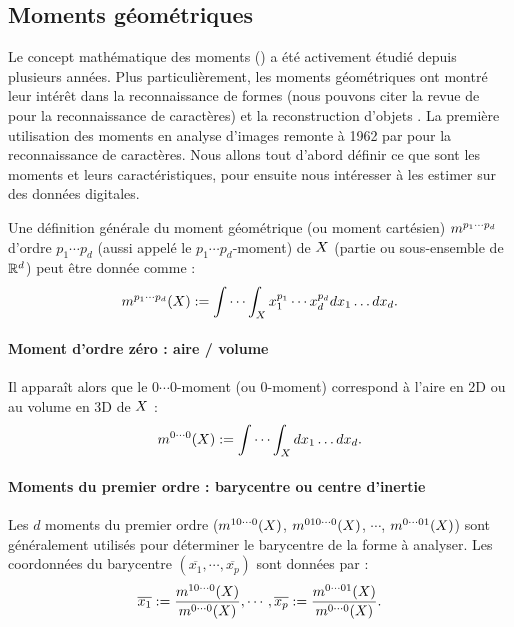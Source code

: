 \subsection{Moments géométriques}
\label{sec:moments-geo}
%
Le concept mathématique des moments () a été
activement étudié depuis plusieurs années. Plus particulièrement, les moments
géométriques ont montré leur intérêt dans la reconnaissance de formes (nous
pouvons citer la revue de  pour la reconnaissance de
caractères) et la reconstruction d'objets \cite{Ghorbel2005}. La première
utilisation des moments en analyse d'images remonte à 1962 par
 pour la reconnaissance de caractères.
%
Nous allons tout d'abord définir ce que sont les moments et leurs
caractéristiques, pour ensuite nous intéresser à les estimer sur des données
digitales.

%
%
%
Une définition générale du moment géométrique (ou moment cartésien) $m^{p_1
\cdots p_d}$ d'ordre $p_1 \cdots p_d$ (aussi appelé le $p_1 \cdots p_d$-moment)
de $X$ (partie ou sous-ensemble de $\mathbb{R}^d$) peut être donnée comme :
%
\begin{equation}
  m^{p_1 \cdots p_d}(X) := \idotsint_{X} x_1^{p_1} \cdots x_d^{p_d} dx_1 \ldots dx_d.
\end{equation}
%
\paragraph{Moment d'ordre zéro : aire / volume}
%
Il apparaît alors que le $0\cdots0$-moment (ou $0$-moment) correspond à l'aire
en 2D ou au volume en 3D de $X$ :
%
\begin{equation}
  m^{0 \cdots 0}(X) := \idotsint_{X}  dx_1 \ldots dx_d.
\end{equation}
%
\paragraph{Moments du premier ordre : barycentre ou centre d'inertie}
%
Les $d$ moments du premier ordre ($m^{1 0 \cdots 0}(X)$, $m^{0 1 0
\cdots 0}(X)$, $\cdots$, $m^{0 \cdots 0 1}(X)$) sont généralement
utilisés pour déterminer le barycentre de la forme à analyser. Les coordonnées
du barycentre $(\overline{x_1}, \cdots, \overline{x_p})$ sont données par :
%
\begin{equation}
  \overline{x_1} := \frac{m^{1 0 \cdots 0}(X)}{m^{0 \cdots 0}(X)}, \cdots, \overline{x_p} := \frac{m^{0 \cdots 0 1}(X)}{m^{0 \cdots 0}(X)}.
\end{equation}
%
